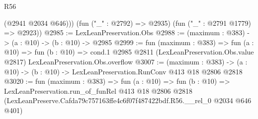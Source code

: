 \begin{lexlean}{R56}
\begin{coremodule}
          (@2941 @2034 @646)))
      (fun ("_" : @2792) => @2935)
      (fun ("_" : @2791 @1779) => @2923))
@2985 := LexLeanPreservation.Obs
@2988 := (maximum : @383) -> (a : @10) -> (b : @10) -> @2985
@2999 := fun (maximum : @383) =>
  fun (a : @10) =>
  fun (b : @10) =>
  cond.{1} @2985 @2811 (LexLeanPreservation.Obs.value @2817) LexLeanPreservation.Obs.overflow
@3007 := (maximum : @383) ->
  (a : @10) -> (b : @10) -> LexLeanPreservation.RunConv @413 @18 @2806 @2818
@3020 := fun (maximum : @383) =>
  fun (a : @10) =>
  fun (b : @10) =>
  LexLeanPreservation.run_of_funRel
    @413
    @18
    @2806
    @2818
    (LexLeanPreserve.Cafda79c757163ffe4c6f07f487422bdf.R56.__rel_0 @2034 @646 @401)
\end{coremodule}
\end{lexlean}
